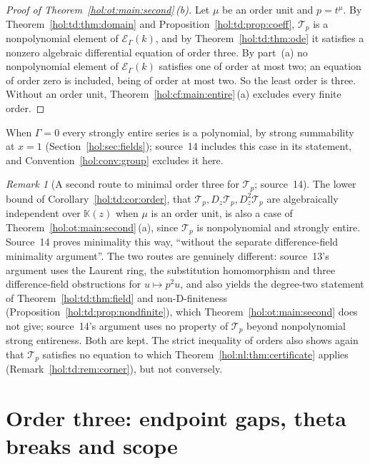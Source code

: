 \documentclass[11pt]{article}
\numberwithin{equation}{section}
\theoremstyle{definition}
\theoremstyle{remark}
\newtheorem{remark}[theorem]{Remark}
\newcommand{\KK}{\mathbb K}
\newcommand{\EK}{\mathcal E_\Gamma(k)}
\begin{document}
\begin{proof}[Proof of Theorem~\ref{hol:ot:main:second}\,\textup{(b)}]
Let $\mu$ be an order unit and $p=t^\mu$. By
Theorem~\ref{hol:td:thm:domain} and Proposition~\ref{hol:td:prop:coeff},
$\mathcal T_p$ is a nonpolynomial element of $\EK$, and by
Theorem~\ref{hol:td:thm:ode} it satisfies a nonzero algebraic differential
equation of order three. By part~(a) no nonpolynomial element of $\EK$
satisfies one of order at most two; an equation of order zero is included,
being of order at most two. So the least order is three. Without an order
unit, Theorem~\ref{hol:cf:main:entire}\,(a) excludes every finite order.
\end{proof}

When $\Gamma=0$ every strongly entire series is a polynomial, by strong
summability at $x=1$ (Section~\ref{hol:sec:fields}); source~14 includes this
case in its statement, and Convention~\ref{hol:conv:group} excludes it here.

\begin{remark}[A second route to minimal order three for $\mathcal T_p$;
source~14]\label{hol:ot:rem:secondroute}
The lower bound of Corollary~\ref{hol:td:cor:order}, that
$\mathcal T_p,D_z\mathcal T_p,D_z^2\mathcal T_p$ are algebraically independent
over $\KK(z)$ when $\mu$ is an order unit, is also a case of
Theorem~\ref{hol:ot:main:second}\,(a), since $\mathcal T_p$ is nonpolynomial
and strongly entire. Source~14 proves minimality this way, ``without the
separate difference-field minimality argument''. The two routes are genuinely
different: source~13's argument uses the Laurent ring, the substitution
homomorphism and three difference-field obstructions for $u\mapsto p^2u$, and
also yields the degree-two statement of Theorem~\ref{hol:td:thm:field} and
non-D-finiteness (Proposition~\ref{hol:td:prop:nondfinite}), which
Theorem~\ref{hol:ot:main:second} does not give; source~14's argument uses no
property of $\mathcal T_p$ beyond nonpolynomial strong entireness. Both are
kept. The strict inequality of orders also shows again that
$\mathcal T_p$ satisfies no equation to which
Theorem~\ref{hol:nl:thm:certificate} applies (Remark~\ref{hol:td:rem:corner}),
but not conversely.
\end{remark}

\section{Order three: endpoint gaps, theta breaks and scope}
\label{hol:ot:sec:theta}
\end{document}
